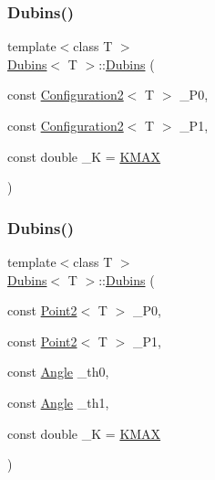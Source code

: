 \subsubsection{\texorpdfstring{Dubins()}{Dubins()}\hspace{0.1cm}{\footnotesize\ttfamily [2/4]}}
{\footnotesize\ttfamily template$<$class T $>$ \\
\mbox{\hyperlink{class_dubins}{Dubins}}$<$ T $>$\+::\mbox{\hyperlink{class_dubins}{Dubins}} (\begin{DoxyParamCaption}\item[{const \mbox{\hyperlink{class_configuration2}{Configuration2}}$<$ T $>$}]{\+\_\+\+P0,  }\item[{const \mbox{\hyperlink{class_configuration2}{Configuration2}}$<$ T $>$}]{\+\_\+\+P1,  }\item[{const double}]{\+\_\+K = {\ttfamily \mbox{\hyperlink{dubins_8hh_a940b85a83458e94519f2685b33ddd276}{K\+M\+AX}}} }\end{DoxyParamCaption})\hspace{0.3cm}{\ttfamily [inline]}}

\mbox{\label{class_dubins_a6120f64c71b7a37bc1051f9f87c02e9e}} 
\subsubsection{\texorpdfstring{Dubins()}{Dubins()}\hspace{0.1cm}{\footnotesize\ttfamily [3/4]}}
{\footnotesize\ttfamily template$<$class T $>$ \\
\mbox{\hyperlink{class_dubins}{Dubins}}$<$ T $>$\+::\mbox{\hyperlink{class_dubins}{Dubins}} (\begin{DoxyParamCaption}\item[{const \mbox{\hyperlink{class_point2}{Point2}}$<$ T $>$}]{\+\_\+\+P0,  }\item[{const \mbox{\hyperlink{class_point2}{Point2}}$<$ T $>$}]{\+\_\+\+P1,  }\item[{const \mbox{\hyperlink{class_angle}{Angle}}}]{\+\_\+th0,  }\item[{const \mbox{\hyperlink{class_angle}{Angle}}}]{\+\_\+th1,  }\item[{const double}]{\+\_\+K = {\ttfamily \mbox{\hyperlink{dubins_8hh_a940b85a83458e94519f2685b33ddd276}{K\+M\+AX}}} }\end{DoxyParamCaption})\hspace{0.3cm}{\ttfamily [inline]}}

